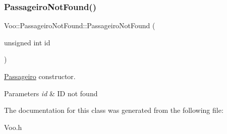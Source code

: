 \subsubsection{\texorpdfstring{Passageiro\+Not\+Found()}{PassageiroNotFound()}}
{\footnotesize\ttfamily Voo\+::\+Passageiro\+Not\+Found\+::\+Passageiro\+Not\+Found (\begin{DoxyParamCaption}\item[{unsigned int}]{id }\end{DoxyParamCaption})\hspace{0.3cm}{\ttfamily [inline]}}



\hyperlink{class_passageiro}{Passageiro} constructor. 


\begin{DoxyParams}{Parameters}
{\em id} & ID not found \\
\hline
\end{DoxyParams}


The documentation for this class was generated from the following file\+:\begin{DoxyCompactItemize}
\item 
Voo.\+h\end{DoxyCompactItemize}
